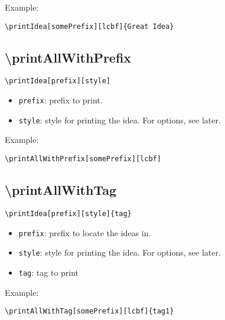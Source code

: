 \documentclass[11pt]{article}
\begin{document}
\par Example:
\begin{verbatim}
\printIdea[somePrefix][lcbf]{Great Idea}
\end{verbatim}

\subsection{\textbackslash{}printAllWithPrefix}
\begin{verbatim}
\printIdea[prefix][style]
\end{verbatim}

\begin{itemize}
\item \texttt{prefix}: prefix to print.
\item \texttt{style}: style for printing the idea. For options, see later.
\end{itemize}

\par Example:
\begin{verbatim}
\printAllWithPrefix[somePrefix][lcbf]
\end{verbatim}

\subsection{\textbackslash{}printAllWithTag}
\begin{verbatim}
\printIdea[prefix][style]{tag}
\end{verbatim}

\begin{itemize}
\item \texttt{prefix}: prefix to locate the ideas in.
\item \texttt{style}: style for printing the idea. For options, see later.
\item \texttt{tag}: tag to print
\end{itemize}

\par Example:
\begin{verbatim}
\printAllWithTag[somePrefix][lcbf]{tag1}
\end{verbatim}
\end{document}
